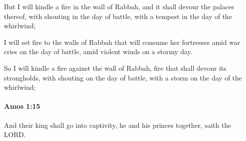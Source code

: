 			\begin{versebox}
					\item[BHS] 
					\item[LXX] 
					\item[ASV] But I will kindle a fire in the wall of Rabbah, and it shall devour the palaces thereof, with shouting in the day of battle, with a tempest in the day of the whirlwind;
					\item[NIV] I will set fire to the walls of Rabbah that will consume her fortresses amid war cries on the day of battle, amid violent winds on a stormy day.
					\item[NRSV] So I will kindle a fire against the wall of Rabbah, fire that shall devour its strongholds, with shouting on the day of battle, with a storm on the day of the whirlwind;
			\end{versebox}

		\paragraph{Amos 1:15} %
			\label{AMOS-1-15}

			And their king shall go into captivity, he and his princes together, saith the LORD.

